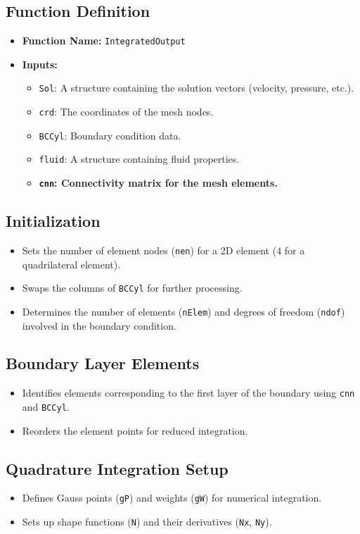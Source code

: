 \documentclass[a4paper,12pt]{article} %
\begin{document}
\subsection*{Function Definition}
\begin{itemize}
    \item \textbf{Function Name:} \texttt{IntegratedOutput}
    \item \textbf{Inputs:}
    \begin{itemize}
        \item \texttt{Sol}: A structure containing the solution vectors (velocity, pressure, etc.).
        \item \texttt{crd}: The coordinates of the mesh nodes.
        \item \texttt{BCCyl}: Boundary condition data.
        \item \texttt{fluid}: A structure containing fluid properties.
        \item \textbf{\texttt{cnn}: Connectivity matrix for the mesh elements.}
    \end{itemize}
\end{itemize}

\subsection*{Initialization}
\begin{itemize}
    \item Sets the number of element nodes (\texttt{nen}) for a 2D element (4 for a quadrilateral element).
    \item Swaps the columns of \texttt{BCCyl} for further processing.
    \item Determines the number of elements (\texttt{nElem}) and degrees of freedom (\texttt{ndof}) involved in the boundary condition.
\end{itemize}

\subsection*{Boundary Layer Elements}
\begin{itemize}
    \item Identifies elements corresponding to the first layer of the boundary using \texttt{cnn} and \texttt{BCCyl}.
    \item Reorders the element points for reduced integration.
\end{itemize}

\subsection*{Quadrature Integration Setup}
\begin{itemize}
    \item Defines Gauss points (\texttt{gP}) and weights (\texttt{gW}) for numerical integration.
    \item Sets up shape functions (\texttt{N}) and their derivatives (\texttt{Nx}, \texttt{Ny}).
\end{itemize}
\end{document}
